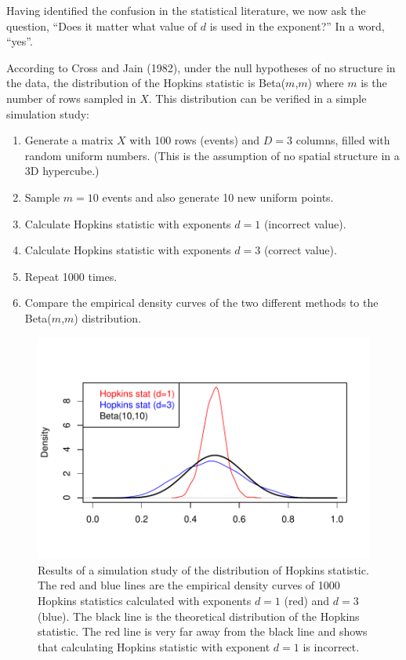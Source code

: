 Having identified the confusion in the statistical literature, we now ask the question, ``Does it matter what value of \(d\) is used in the exponent?'' In a word, ``yes''.

According to Cross and Jain (1982), under the null hypotheses of no structure in the data, the distribution of the Hopkins statistic is Beta(\(m\),\(m\)) where \(m\) is the number of rows sampled in \(X\). This distribution can be verified in a simple simulation study:

\begin{enumerate}
\def\labelenumi{\arabic{enumi}.}
\tightlist
\item
  Generate a matrix \(X\) with 100 rows (events) and \(D=3\) columns, filled with random uniform numbers. (This is the assumption of no spatial structure in a 3D hypercube.)
\item
  Sample \(m=10\) events and also generate 10 new uniform points.
\item
  Calculate Hopkins statistic with exponents \(d=1\) (incorrect value).
\item
  Calculate Hopkins statistic with exponents \(d=3\) (correct value).
\item
  Repeat 1000 times.
\item
  Compare the empirical density curves of the two different methods to the Beta(\(m\),\(m\)) distribution.
\end{enumerate}

\begin{figure}

{\centering \includegraphics[width=0.9\linewidth]{hopkins_files/figure-latex/simulation-1} 

}

\caption{Results of a simulation study of the distribution of Hopkins statistic. The red and blue lines are the empirical density curves of 1000 Hopkins statistics calculated with exponents $d=1$ (red) and $d=3$ (blue). The black line is the theoretical distribution of the Hopkins statistic. The red line is very far away from the black line and shows that calculating Hopkins statistic with exponent $d=1$ is incorrect.}\label{fig:simulation}
\end{figure}

